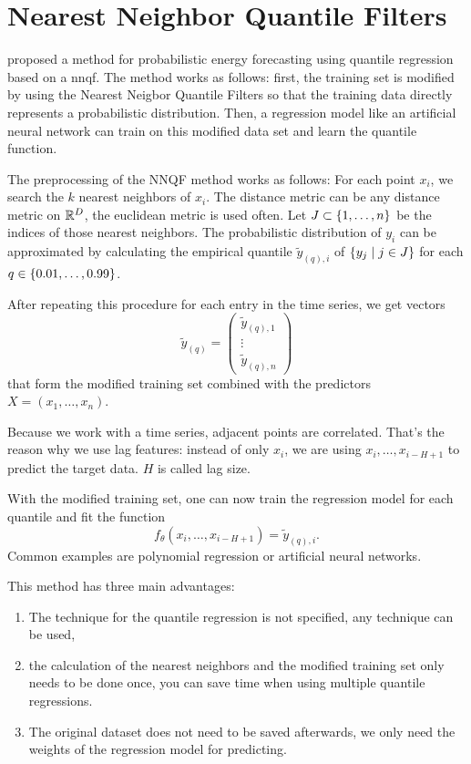 \section{Nearest Neighbor Quantile Filters}
\label{sec:nnqf}

\Textcite{Ordiano2019} proposed a method for probabilistic 
energy forecasting using quantile regression based on a \gls{nnqf}. 
The method works as follows: first, the training set is modified 
by using the Nearest Neigbor Quantile Filters so that 
the training data directly represents a probabilistic distribution. 
Then, a regression model like an artificial neural network can 
train on this modified data set and learn the quantile function.

The preprocessing of the NNQF method works as follows: 
For each point \(x_i\), we search the \(k\) nearest neighbors 
of \(x_i\).
The distance metric can be any distance metric on \(\mathbb{R}^D\), 
the euclidean metric is used often.
Let \(J \subset \{1, \ldots, n\}\) be the indices of 
those nearest neighbors. 
The probabilistic distribution of \(y_i\) can be approximated 
by calculating the empirical quantile \(\tilde{y}_{(q),i}\) of 
\(\{y_j \;|\; j\in J\}\) for each \(q \in \{0.01, \ldots, 0.99\}\). 

After repeating this procedure for each entry in the time series, 
we get vectors 
\[ \tilde{y}_{(q)} = \begin{pmatrix}
    \tilde{y}_{(q), 1} \\ 
    \vdots \\
    \tilde{y}_{(q), n}
\end{pmatrix} \]
that form the modified training set combined with the 
predictors \(X = (x_1, \ldots, x_n)\).

Because we work with a time series, adjacent points are correlated. 
That's the reason why we use lag features: 
instead of only \(x_i\), we are using \(x_i, \ldots, x_{i-H+1}\) to 
predict the target data. \(H\) is called lag size.

With the modified training set, one can now train the regression model 
for each quantile and fit the function 
\[ f_\theta(x_i, \ldots, x_{i-H+1}) = \tilde{y}_{(q), i}. \]
Common examples are polynomial regression or 
artificial neural networks. 

This method has three main advantages: 
\begin{enumerate}
    \item The technique for the quantile regression is not specified, 
    any technique can be used,
    \item the calculation of the nearest neighbors and the modified 
    training set only needs to be done once, you can save time when 
    using multiple quantile regressions. 
    \item The original dataset does not need to be saved afterwards, 
    we only need the weights of the regression model for predicting.
\end{enumerate}

